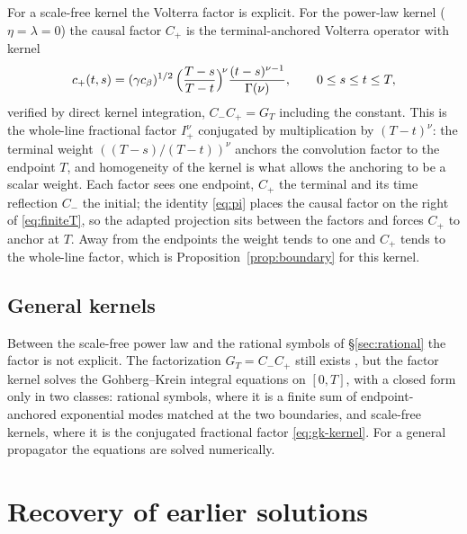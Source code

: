 \documentclass[11pt]{article}
\theoremstyle{plain}
\theoremstyle{definition}
\theoremstyle{remark}
\begin{document}
For a scale-free kernel the Volterra factor is explicit. For the power-law kernel ($\eta=\lambda=0$) the causal factor $C_+$ is the terminal-anchored Volterra operator with kernel
\begin{equation}\label{eq:gk-kernel}
c_+(t,s) = (\gamma c_\beta)^{1/2}\,\Bigl(\frac{T-s}{T-t}\Bigr)^{\!\nu}\frac{(t-s)^{\nu-1}}{\Gamma(\nu)},
\qquad 0\le s\le t\le T,
\end{equation}
verified by direct kernel integration, $C_-C_+=G_T$ including the constant. This is the whole-line fractional factor $I^\nu_+$ conjugated by multiplication by $(T-t)^\nu$: the terminal weight $((T-s)/(T-t))^\nu$ anchors the convolution factor to the endpoint $T$, and homogeneity of the kernel is what allows the anchoring to be a scalar weight. Each factor sees one endpoint, $C_+$ the terminal and its time reflection $C_-$ the initial; the identity \eqref{eq:pi} places the causal factor on the right of \eqref{eq:finiteT}, so the adapted projection sits between the factors and forces $C_+$ to anchor at $T$. Away from the endpoints the weight tends to one and $C_+$ tends to the whole-line factor, which is Proposition~\ref{prop:boundary} for this kernel.

\subsection{General kernels}\label{sec:gkgeneral}

Between the scale-free power law and the rational symbols of \S\ref{sec:rational} the factor is not explicit. The factorization $G_T=C_-C_+$ still exists \citep{GohbergKrein1970,Arveson1975}, but the factor kernel solves the Gohberg--Krein integral equations on $[0,T]$, with a closed form only in two classes: rational symbols, where it is a finite sum of endpoint-anchored exponential modes matched at the two boundaries, and scale-free kernels, where it is the conjugated fractional factor \eqref{eq:gk-kernel}. For a general propagator the equations are solved numerically.

\section{Recovery of earlier solutions}\label{sec:recovery}
\end{document}

